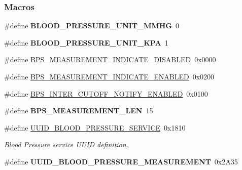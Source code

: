 \subsubsection*{Macros}
\begin{DoxyCompactItemize}
\item 
\#define {\bfseries B\+L\+O\+O\+D\+\_\+\+P\+R\+E\+S\+S\+U\+R\+E\+\_\+\+U\+N\+I\+T\+\_\+\+M\+M\+HG}~0\hypertarget{group___b_l_e___b_p_s_gaa0f5912a7a0334803c4e857508413589}{}\label{group___b_l_e___b_p_s_gaa0f5912a7a0334803c4e857508413589}

\item 
\#define {\bfseries B\+L\+O\+O\+D\+\_\+\+P\+R\+E\+S\+S\+U\+R\+E\+\_\+\+U\+N\+I\+T\+\_\+\+K\+PA}~1\hypertarget{group___b_l_e___b_p_s_ga2436fd11015e45e780cd0e9874b194c1}{}\label{group___b_l_e___b_p_s_ga2436fd11015e45e780cd0e9874b194c1}

\item 
\#define \hyperlink{group___b_l_e___b_p_s_ga74b1609781f74c3c9bcc29d375a28fc9}{B\+P\+S\+\_\+\+M\+E\+A\+S\+U\+R\+E\+M\+E\+N\+T\+\_\+\+I\+N\+D\+I\+C\+A\+T\+E\+\_\+\+D\+I\+S\+A\+B\+L\+ED}~0x0000
\item 
\#define \hyperlink{group___b_l_e___b_p_s_gad0e0abaa394291423191503f02f77e5c}{B\+P\+S\+\_\+\+M\+E\+A\+S\+U\+R\+E\+M\+E\+N\+T\+\_\+\+I\+N\+D\+I\+C\+A\+T\+E\+\_\+\+E\+N\+A\+B\+L\+ED}~0x0200
\item 
\#define \hyperlink{group___b_l_e___b_p_s_ga76b8d9a227bd64b830b4aff30533d843}{B\+P\+S\+\_\+\+I\+N\+T\+E\+R\+\_\+\+C\+U\+T\+O\+F\+F\+\_\+\+N\+O\+T\+I\+F\+Y\+\_\+\+E\+N\+A\+B\+L\+ED}~0x0100
\item 
\#define {\bfseries B\+P\+S\+\_\+\+M\+E\+A\+S\+U\+R\+E\+M\+E\+N\+T\+\_\+\+L\+EN}~15\hypertarget{group___b_l_e___b_p_s_ga9b6223a3d6548ad5370d49f4dc64952a}{}\label{group___b_l_e___b_p_s_ga9b6223a3d6548ad5370d49f4dc64952a}

\item 
\#define \hyperlink{group___b_l_e___b_p_s_ga743d53a92df1edc5fcc7ab76be172bd3}{U\+U\+I\+D\+\_\+\+B\+L\+O\+O\+D\+\_\+\+P\+R\+E\+S\+S\+U\+R\+E\+\_\+\+S\+E\+R\+V\+I\+CE}~0x1810\hypertarget{group___b_l_e___b_p_s_ga743d53a92df1edc5fcc7ab76be172bd3}{}\label{group___b_l_e___b_p_s_ga743d53a92df1edc5fcc7ab76be172bd3}

\begin{DoxyCompactList}\small\item\em Blood Pressure service U\+U\+ID definition. \end{DoxyCompactList}\item 
\#define {\bfseries U\+U\+I\+D\+\_\+\+B\+L\+O\+O\+D\+\_\+\+P\+R\+E\+S\+S\+U\+R\+E\+\_\+\+M\+E\+A\+S\+U\+R\+E\+M\+E\+NT}~0x2\+A35\hypertarget{group___b_l_e___b_p_s_gadd7e6b60b56182c316fe5894074dd0b5}{}\label{group___b_l_e___b_p_s_gadd7e6b60b56182c316fe5894074dd0b5}


\end{DoxyCompactItemize}
